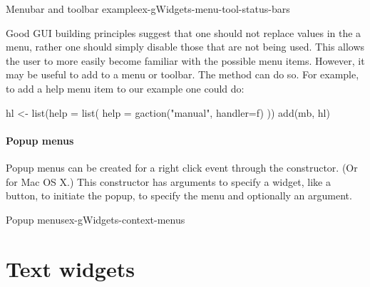 \begin{example}{Menubar and toolbar example}{ex-gWidgets-menu-tool-status-bars}

Good GUI building principles suggest that one should not replace
values in the a menu, rather one should simply disable those that are
not being used. This allows the user to more easily become familiar
with the possible menu items. However, it may be useful to add to a
menu or toolbar. The  method can do so. For
example, to add a help menu item to our example one could do:
\begin{Schunk}
\begin{Sinput}
 hl <- list(help = list(
              help = gaction("manual", handler=f)
              ))
 add(mb, hl)
\end{Sinput}
\end{Schunk}




        
\end{example}

\paragraph{Popup menus}

Popup menus can be created for a right click event through the  constructor. (Or  for Mac OS X.) This constructor has arguments  to specify a widget, like a button, to initiate the popup,  to specify the menu and optionally an  argument.


\begin{example}{Popup menus}{ex-gWidgets-context-menus}
\begin{Schunk}
\end{Schunk}

\end{example}


\section{Text widgets}
\label{sec:text-widgets}

